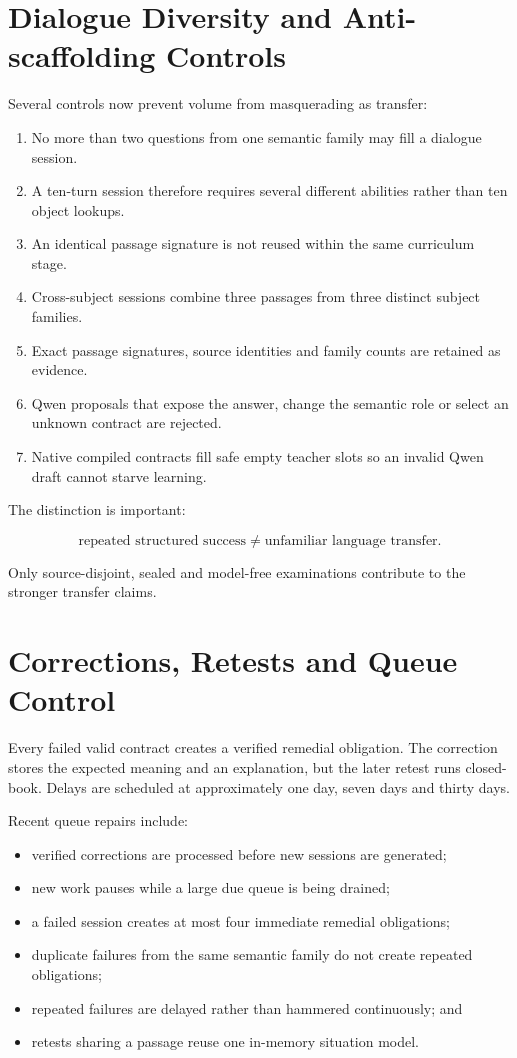 \documentclass[11pt,a4paper]{article}
\begin{document}
\section{Dialogue Diversity and Anti-scaffolding Controls}

Several controls now prevent volume from masquerading as transfer:

\begin{enumerate}
  \item No more than two questions from one semantic family may fill a dialogue session.
  \item A ten-turn session therefore requires several different abilities rather than ten object
        lookups.
  \item An identical passage signature is not reused within the same curriculum stage.
  \item Cross-subject sessions combine three passages from three distinct subject families.
  \item Exact passage signatures, source identities and family counts are retained as evidence.
  \item Qwen proposals that expose the answer, change the semantic role or select an unknown
        contract are rejected.
  \item Native compiled contracts fill safe empty teacher slots so an invalid Qwen draft cannot
        starve learning.
\end{enumerate}

The distinction is important:

\[
\text{repeated structured success} \neq \text{unfamiliar language transfer}.
\]

Only source-disjoint, sealed and model-free examinations contribute to the stronger transfer
claims.

\section{Corrections, Retests and Queue Control}

Every failed valid contract creates a verified remedial obligation.  The correction stores the
expected meaning and an explanation, but the later retest runs closed-book.  Delays are scheduled
at approximately one day, seven days and thirty days.

Recent queue repairs include:

\begin{itemize}
  \item verified corrections are processed before new sessions are generated;
  \item new work pauses while a large due queue is being drained;
  \item a failed session creates at most four immediate remedial obligations;
  \item duplicate failures from the same semantic family do not create repeated obligations;
  \item repeated failures are delayed rather than hammered continuously; and
  \item retests sharing a passage reuse one in-memory situation model.
\end{itemize}
\end{document}
